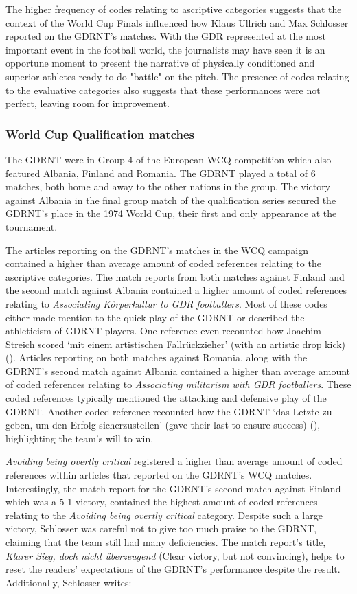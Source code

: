 The higher frequency of codes relating to ascriptive categories suggests that the context of the World Cup Finals influenced how Klaus Ullrich and Max Schlosser reported on the GDRNT’s matches. With the GDR represented at the most important event in the football world, the journalists may have seen it is an opportune moment to present the narrative of physically conditioned and superior athletes ready to do "battle" on the pitch. The presence of codes relating to the evaluative categories also suggests that these performances were not perfect, leaving room for improvement.

\subsubsection*{World Cup Qualification matches}

The GDRNT were in Group 4 of the European WCQ competition which also featured Albania, Finland and Romania. The GDRNT played a total of 6 matches, both home and away to the other nations in the group. The victory against Albania in the final group match of the qualification series secured the GDRNT’s place in the 1974 World Cup, their first and only appearance at the tournament.

The articles reporting on the GDRNT’s matches in the WCQ campaign contained a higher than average amount of coded references relating to the ascriptive categories. The match reports from both matches against Finland and the second match against Albania contained a higher amount of coded references relating to \textit{Associating Körperkultur to GDR footballers}. Most of these codes either made mention to the quick play of the GDRNT or described the athleticism of GDRNT players. One reference even recounted how Joachim Streich scored ‘mit einem artistischen Fallrückzieher’ (with an artistic drop kick) (\cite{nd19730607}). Articles reporting on both matches against Romania, along with the GDRNT’s second match against Albania contained a higher than average amount of coded references relating to \textit{Associating militarism with GDR footballers}. These coded references typically mentioned the attacking and defensive play of the GDRNT. Another coded reference recounted how the GDRNT ‘das Letzte zu geben, um den Erfolg sicherzustellen’ (gave their last to ensure success) (\cite{nd19730927}), highlighting the team’s will to win.

\textit{Avoiding being overtly critical} registered a higher than average amount of coded references within articles that reported on the GDRNT’s WCQ matches. Interestingly, the match report for the GDRNT’s second match against Finland which was a 5-1 victory, contained the highest amount of coded references relating to the \textit{Avoiding being overtly critical} category. Despite such a large victory, Schlosser was careful not to give too much praise to the GDRNT, claiming that the team still had many deficiencies. The match report’s title, \textit{Klarer Sieg, doch nicht überzeugend} (Clear victory, but not convincing), helps to reset the readers’ expectations of the GDRNT’s performance despite the result. Additionally, Schlosser writes:


